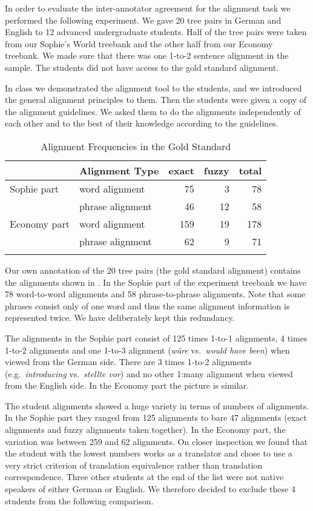 \documentclass[output=paper]{LSP/langsci}
\begin{document}
In order to evaluate the inter-annotator agreement for the alignment task we performed the following experiment. We gave 20 tree pairs in German and English to 12 advanced undergraduate students. Half of the tree pairs were taken from our Sophie's World treebank and the other half from our Economy treebank. We made sure that there was one 1-to-2 sentence alignment in the sample. The students did not have access to the gold standard alignment. 

In class we demonstrated the alignment tool to the students, and we introduced the general alignment principles to them. Then the students were given a copy of the alignment guidelines. We asked them to do the alignments independently of each other and to the best of their knowledge according to the guidelines. 

\begin{table}
\begin{tabular}{llrrr} 
\lsptoprule
& \bfseries Alignment Type & \bfseries exact & \bfseries fuzzy & \bfseries total\\
\midrule
Sophie part & word alignment & 75 & 3 & 78 \\
& phrase alignment & 46 & 12 & 58 \\
Economy part & word alignment & 159 & 19 & 178 \\
& phrase alignment & 62 & 9 & 71 \\
\lspbottomrule
\end{tabular}
\caption{Alignment Frequencies in the Gold Standard}
\label{tab:volkmareksamuelsson:1}
\end{table}


Our own annotation of the 20 tree pairs (the gold standard alignment) contains the alignments shown in . In the Sophie part of the experiment treebank we have 78 word-to-word alignments and 58 phrase-to-phrase alignments. Note that some phrases consist only of one word and thus the same alignment information is represented twice. We have deliberately kept this redundancy. 

The alignments in the Sophie part consist of 125 times 1-to-1 alignments, 4 times 1-to-2 alignments and one 1-to-3 alignment (\textit{wäre }vs.~\textit{would have been}) when viewed from the German side. There are 3 times 1-to-2 alignments (e.g.~\textit{introducing }vs.~\textit{stellte vor}) and no other 1:many alignment when viewed from the English side. In the Economy part the picture is similar. 

The student alignments showed a huge variety in terms of numbers of alignments. In the Sophie part they ranged from 125 alignments to bare 47 alignments (exact alignments and fuzzy alignments taken together). In the Economy part, the variation was between 259 and 62 alignments. On closer inspection we found that the student with the lowest numbers works as a translator and chose to use a very strict criterion of translation equivalence rather than translation correspondence. Three other students at the end of the list were not native speakers of either German or English. We therefore decided to exclude these 4 students from the following comparison. 
\end{document}
